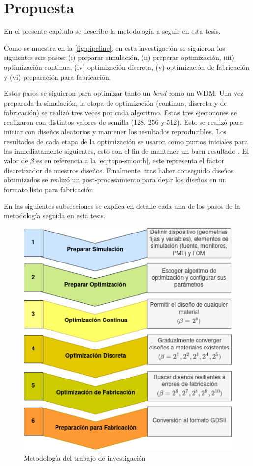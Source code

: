 \chapter{Propuesta}

En el presente capítulo se describe la metodología a seguir en esta tesis.

Como se muestra en la \autoref{fig:pipeline}, en esta investigación se siguieron los siguientes seis pasos:
(i) preparar simulación, 
(ii) preparar optimización, 
(iii) optimización continua,
(iv) optimización discreta,
(v) optimización de fabricación y
(vi) preparación para fabricación.

Estos pasos se siguieron para optimizar tanto un \emph{bend} como un WDM.
Una vez preparada la simulación, la etapa de optimización (continua, discreta y de fabricación) se realizó
tres veces por cada algoritmo.
Estas tres ejecuciones se realizaron con distintos valores de semilla (128, 256 y 512).
Esto se realizó para iniciar con diseños aleatorios y mantener los resultados reproducibles.
Los resultados de cada etapa de la optimización se usaron como puntos iniciales para las inmediatamente
siguientes, esto con el fin de mantener un buen resultado \citep{Yang2017}.
El valor de $\beta$ es en referencia a la \autoref{eq:topo-smooth}, este representa el factor discretizador de nuestros diseños.
Finalmente, tras haber conseguido diseños obtimizados se realizó un post-procesamiento para dejar los diseños
en un formato listo para fabricación.

En las siguientes subsecciones se explica en detalle cada una de los pasos de la metodología seguida en esta tesis.

\begin{figure}[ht]
  \centering
  \includegraphics[width=\textwidth]{image/proposal/pipeline.png}
  \caption{Metodología del trabajo de investigación}
  \label{fig:pipeline}
\end{figure}

